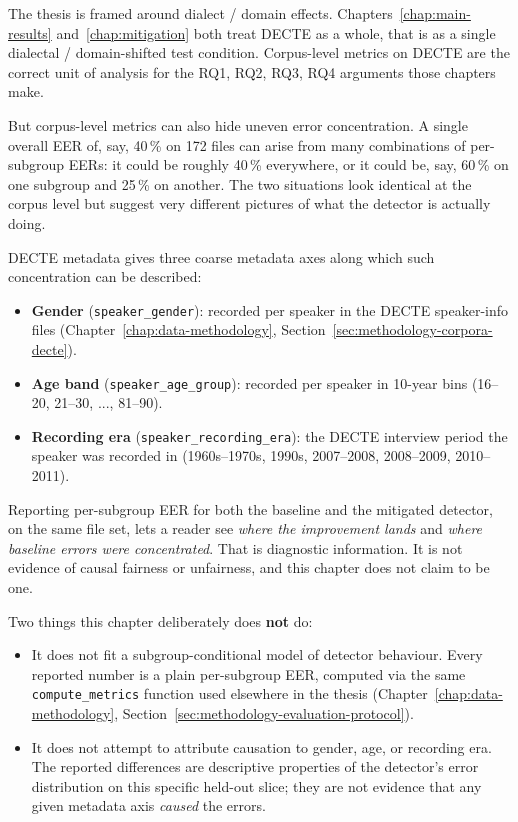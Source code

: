 The thesis is framed around dialect / domain effects. Chapters~\ref{chap:main-results}
and~\ref{chap:mitigation} both treat DECTE as a whole, that is as a single dialectal
/ domain-shifted test condition. Corpus-level metrics on DECTE are
the correct unit of analysis for the RQ1, RQ2, RQ3, RQ4 arguments
those chapters make.

But corpus-level metrics can also hide uneven error
concentration. A single overall EER of, say, 40\,\% on 172 files
can arise from many combinations of per-subgroup EERs: it could
be roughly 40\,\% everywhere, or it could be, say, 60\,\% on one
subgroup and 25\,\% on another. The two situations look identical
at the corpus level but suggest very different pictures of what
the detector is actually doing.

DECTE metadata gives three coarse metadata axes along which such
concentration can be described:

\begin{itemize}
    \item \textbf{Gender} (\texttt{speaker\_gender}): recorded per speaker in the
        DECTE speaker-info files (Chapter~\ref{chap:data-methodology}, Section~\ref{sec:methodology-corpora-decte}).
    \item \textbf{Age band} (\texttt{speaker\_age\_group}): recorded per speaker in
        10-year bins (16--20, 21--30, ..., 81--90).
    \item \textbf{Recording era} (\texttt{speaker\_recording\_era}): the DECTE
        interview period the speaker was recorded in (1960s--1970s,
        1990s, 2007--2008, 2008--2009, 2010--2011).
\end{itemize}

Reporting per-subgroup EER for both the baseline and the
mitigated detector, on the same file set, lets a reader see
\emph{where the improvement lands} and \emph{where baseline errors were
concentrated}. That is diagnostic information. It is not evidence
of causal fairness or unfairness, and this chapter does not
claim to be one.

Two things this chapter deliberately does \textbf{not} do:

\begin{itemize}
    \item It does not fit a subgroup-conditional model of detector
        behaviour. Every reported number is a plain per-subgroup EER,
        computed via the same \texttt{compute\_metrics} function used elsewhere
        in the thesis (Chapter~\ref{chap:data-methodology}, Section~\ref{sec:methodology-evaluation-protocol}).
    \item It does not attempt to attribute causation to gender, age, or
        recording era. The reported differences are descriptive
        properties of the detector's error distribution on this
        specific held-out slice; they are not evidence that any given
        metadata axis \emph{caused} the errors.
\end{itemize}


